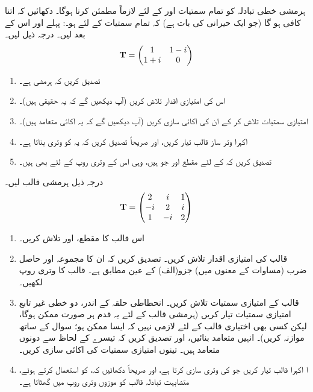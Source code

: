ہرمشی خطی تبادلہ کو تمام سمتیات  اور  کے لئے لازماً  مطمئن کرنا ہوگا۔ دکھائیں کہ اتنا  کافی ہو گا  (جو ایک حیرانی کی بات ہے)   کہ تمام سمتیات  کے لئے  ہو۔: پہلے  اور اس کے بعد  لیں۔ 
درجہ ذیل لیں۔
\begin{align*}
	\operatorname{\mathbf{T}}=
	\begin{pmatrix}
		1 & 1-i\\
		1+i & 0
	\end{pmatrix}
\end{align*}
\begin{enumerate}[a]
\item
 تصدیق کریں کہ  ہرمشی ہے۔
\item
 اس کی امتیازی اقدار تلاش کریں (آپ دیکھیں گے کہ یہ حقیقی ہیں)۔
\item
 امتیازی سمتیات تلاش کر کے ان کی اکائی سازی کریں  (آپ دیکھیں گے کہ یہ اکائی متعامد ہیں)۔
\item
 اکہرا وتر ساز  قالب  تیار کریں،  اور صریحاً تصدیق کریں کہ یہ  کو وتری بناتا ہے۔
\item
 تصدیق کریں کہ  کے لئے مقطع  اور    جو ہیں، وہی  اس کے وتری روپ کے لئے بھی ہیں۔
 \end{enumerate}
درجہ ذیل ہرمشی قالب لیں۔
\begin{align*}
	\operatorname{\mathbf{T}}=
	\begin{pmatrix}
		2 & i & 1\\
		-i & 2 & i\\
		1 & -i & 2
	\end{pmatrix}
\end{align*}
\begin{enumerate}[a]
\item
 اس قالب کا مقطع،   اور   تلاش کریں۔
\item
 قالب  کی امتیازی اقدار تلاش کریں۔ تصدیق کریں کہ ان کا مجموعہ اور حاصل ضرب  (مساوات    کے معنوں میں) جزو(الف) کے عین مطابق ہے۔ قالب  کا  وتری روپ  لکھیں۔
\item
 قالب  کے امتیازی سمتیات تلاش کریں۔ انحطاطی  حلقہ  کے اندر،   دو خطی غیر تابع امتیازی سمتیات تیار کریں (ہرمشی قالب کے لئے یہ قدم ہر صورت ممکن ہوگا،  لیکن کسی بھی اختیاری قالب کے لئے لازمی نہیں کہ ایسا ممکن ہو؛  سوال   کے ساتھ موازنہ کریں)۔ انہیں متعامد بنائیں،  اور تصدیق کریں کہ تیسرے کے لحاظ سے دونوں متعامد ہیں۔ تینوں امتیازی سمتیات کی اکائی سازی کریں۔
\item
ا   اکہرا قالب  تیار کریں جو   کی وتری سازی کرتا ہے،  اور صریحاً دکھائیں کہ،    کو استعمال کرتے ہوئے،  متشابہت تبادلہ قالب   کو موزوں  وتری روپ میں گھٹاتا ہے۔
 \end{enumerate}
